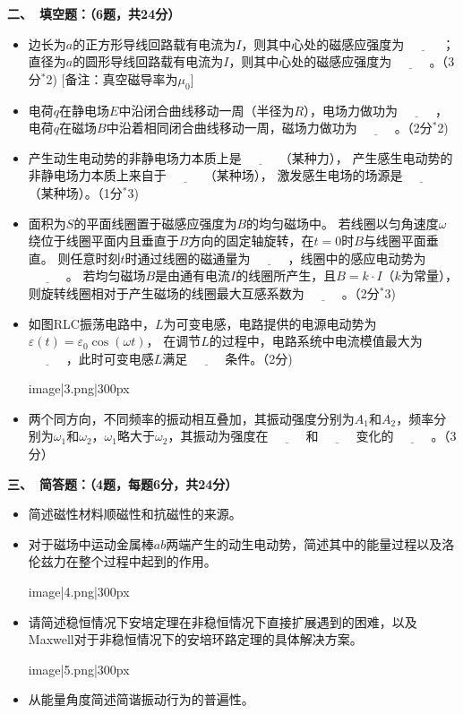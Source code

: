 \textbf{二、\ 填空题：（6题，共24分）}
\begin{itemize}
    \item[1、]边长为$a$的正方形导线回路载有电流为$I$，则其中心处的磁感应强度为$\underline{\qquad\quad}$；
    直径为$a$的圆形导线回路载有电流为$I$，则其中心处的磁感应强度为$\underline{\qquad\quad}$。（3分${\!}^*$2) [备注：真空磁导率为$\mu_0$]
    \item[2、]电荷$q$在静电场$E$中沿闭合曲线移动一周（半径为$R$），电场力做功为$\underline{\qquad\quad}$，
    电荷$q$在磁场$B$中沿着相同闭合曲线移动一周，磁场力做功为$\underline{\qquad\quad}$。（2分${\!}^*$2)
    \item[3、]产生动生电动势的非静电场力本质上是$\underline{\qquad\quad}$（某种力），
    产生感生电动势的非静电场力本质上来自于$\underline{\qquad\quad}$（某种场），
    激发感生电场的场源是$\underline{\qquad\quad}$（某种场）。（1分${\!}^*$3)
    \item[4、]面积为$S$的平面线圈置于磁感应强度为$B$的均匀磁场中。
    若线圈以匀角速度$\omega$绕位于线圈平面内且垂直于$B$方向的固定轴旋转，在$t = 0$时$B$与线圈平面垂直。
    则任意时刻$t$时通过线圈的磁通量为$\underline{\qquad\quad}$，线圈中的感应电动势为$\underline{\qquad\quad}$。
    若均匀磁场$B$是由通有电流$I$的线圈所产生，且$B = k \cdot I$（$k$为常量），
    则旋转线圈相对于产生磁场的线圈最大互感系数为$\underline{\qquad\quad}$。（2分${\!}^*$3)
    \item[5、]如图RLC振荡电路中，$L$为可变电感，电路提供的电源电动势为$\varepsilon(t) = \varepsilon_0 \cos(\omega t)$，
    在调节$L$的过程中，电路系统中电流模值最大为$\underline{\qquad\quad}$，此时可变电感$L$满足$\underline{\qquad\quad}$条件。（2分)
    \begin{center}
        {{image|3.png|300px}}
    \end{center}
    \item[6、]两个同方向，不同频率的振动相互叠加，其振动强度分别为$A_1$和$A_2$，频率分别为$\omega_1$和$\omega_2$，$\omega_1$略大于$\omega_2$，其振动为强度在$\underline{\qquad\quad}$和$\underline{\qquad\quad}$变化的$\underline{\qquad\quad}$。（3分）
\end{itemize}
\textbf{三、\ 简答题：（4题，每题6分，共24分）}
\begin{itemize}
    \item[1、]简述磁性材料顺磁性和抗磁性的来源。
    \item[2、]对于磁场中运动金属棒$ab$两端产生的动生电动势，简述其中的能量过程以及洛伦兹力在整个过程中起到的作用。
    \begin{center}
        {{image|4.png|300px}}
    \end{center}
    \item[3、]请简述稳恒情况下安培定理在非稳恒情况下直接扩展遇到的困难，以及Maxwell对于非稳恒情况下的安培环路定理的具体解决方案。
    \begin{center}
        {{image|5.png|300px}}
    \end{center}
    \item[4、]从能量角度简述简谐振动行为的普遍性。
\end{itemize}
